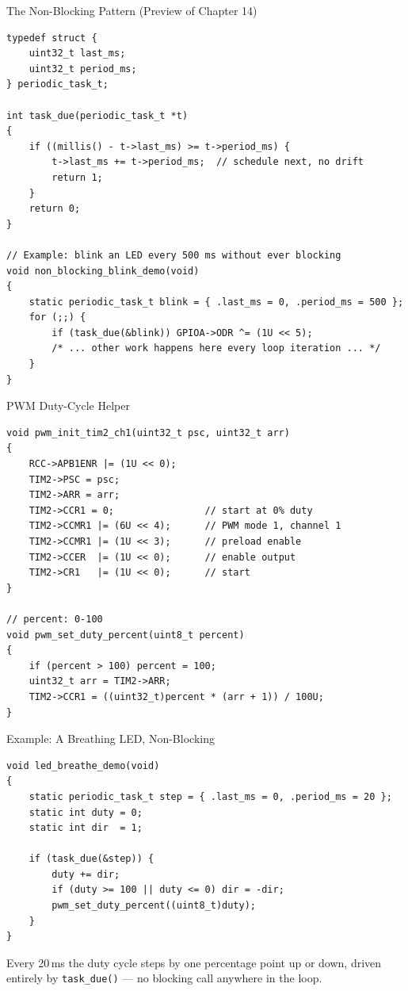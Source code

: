 \documentclass[aspectratio=169]{beamer}
\begin{document}
\begin{frame}[fragile]{The Non-Blocking Pattern (Preview of Chapter 14)}
\begin{lstlisting}
typedef struct {
    uint32_t last_ms;
    uint32_t period_ms;
} periodic_task_t;

int task_due(periodic_task_t *t)
{
    if ((millis() - t->last_ms) >= t->period_ms) {
        t->last_ms += t->period_ms;  // schedule next, no drift
        return 1;
    }
    return 0;
}

// Example: blink an LED every 500 ms without ever blocking
void non_blocking_blink_demo(void)
{
    static periodic_task_t blink = { .last_ms = 0, .period_ms = 500 };
    for (;;) {
        if (task_due(&blink)) GPIOA->ODR ^= (1U << 5);
        /* ... other work happens here every loop iteration ... */
    }
}
\end{lstlisting}
\end{frame}

\begin{frame}[fragile]{PWM Duty-Cycle Helper}
\begin{lstlisting}
void pwm_init_tim2_ch1(uint32_t psc, uint32_t arr)
{
    RCC->APB1ENR |= (1U << 0);
    TIM2->PSC = psc;
    TIM2->ARR = arr;
    TIM2->CCR1 = 0;                // start at 0% duty
    TIM2->CCMR1 |= (6U << 4);      // PWM mode 1, channel 1
    TIM2->CCMR1 |= (1U << 3);      // preload enable
    TIM2->CCER  |= (1U << 0);      // enable output
    TIM2->CR1   |= (1U << 0);      // start
}

// percent: 0-100
void pwm_set_duty_percent(uint8_t percent)
{
    if (percent > 100) percent = 100;
    uint32_t arr = TIM2->ARR;
    TIM2->CCR1 = ((uint32_t)percent * (arr + 1)) / 100U;
}
\end{lstlisting}
\end{frame}

\begin{frame}[fragile]{Example: A Breathing LED, Non-Blocking}
\begin{lstlisting}
void led_breathe_demo(void)
{
    static periodic_task_t step = { .last_ms = 0, .period_ms = 20 };
    static int duty = 0;
    static int dir  = 1;

    if (task_due(&step)) {
        duty += dir;
        if (duty >= 100 || duty <= 0) dir = -dir;
        pwm_set_duty_percent((uint8_t)duty);
    }
}
\end{lstlisting}
{\small Every 20\,ms the duty cycle steps by one percentage point up or
down, driven entirely by \texttt{task\_due()} --- no blocking call
anywhere in the loop.}
\end{frame}
\end{document}
